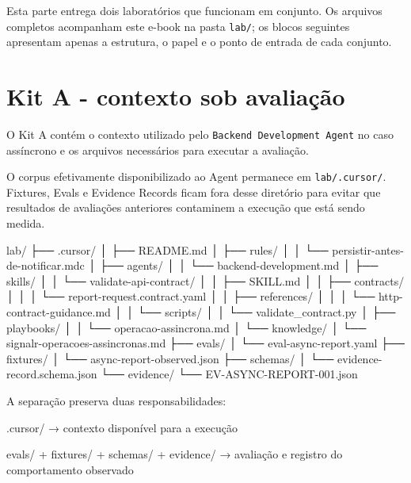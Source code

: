 \documentclass[
  10pt,
  a4paper,
  oneside]{book}
\newenvironment{Shaded}{}{}
\newcommand{\NormalTok}[1]{#1}
\renewenvironment{Shaded}{\begin{snugshade}}{\end{snugshade}}%
\begin{document}
Esta parte entrega dois laboratórios que funcionam em conjunto. Os
arquivos completos acompanham este e-book na pasta \texttt{lab/}; os
blocos seguintes apresentam apenas a estrutura, o papel e o ponto de
entrada de cada conjunto.

\hypertarget{kit-a---contexto-sob-avaliauxe7uxe3o}{%
\section{Kit A - contexto sob
avaliação}\label{kit-a---contexto-sob-avaliauxe7uxe3o}}

O Kit A contém o contexto utilizado pelo
\texttt{Backend\ Development\ Agent} no caso assíncrono e os arquivos
necessários para executar a avaliação.

O corpus efetivamente disponibilizado ao Agent permanece em
\texttt{lab/.cursor/}. Fixtures, Evals e Evidence Records ficam fora
desse diretório para evitar que resultados de avaliações anteriores
contaminem a execução que está sendo medida.

\begin{Shaded}
\begin{Highlighting}[]
\NormalTok{lab/}
\NormalTok{├── .cursor/}
\NormalTok{│   ├── README.md}
\NormalTok{│   ├── rules/}
\NormalTok{│   │   └── persistir{-}antes{-}de{-}notificar.mdc}
\NormalTok{│   ├── agents/}
\NormalTok{│   │   └── backend{-}development.md}
\NormalTok{│   ├── skills/}
\NormalTok{│   │   └── validate{-}api{-}contract/}
\NormalTok{│   │       ├── SKILL.md}
\NormalTok{│   │       ├── contracts/}
\NormalTok{│   │       │   └── report{-}request.contract.yaml}
\NormalTok{│   │       ├── references/}
\NormalTok{│   │       │   └── http{-}contract{-}guidance.md}
\NormalTok{│   │       └── scripts/}
\NormalTok{│   │           └── validate\_contract.py}
\NormalTok{│   ├── playbooks/}
\NormalTok{│   │   └── operacao{-}assincrona.md}
\NormalTok{│   └── knowledge/}
\NormalTok{│       └── signalr{-}operacoes{-}assincronas.md}
\NormalTok{├── evals/}
\NormalTok{│   └── eval{-}async{-}report.yaml}
\NormalTok{├── fixtures/}
\NormalTok{│   └── async{-}report{-}observed.json}
\NormalTok{├── schemas/}
\NormalTok{│   └── evidence{-}record.schema.json}
\NormalTok{└── evidence/}
\NormalTok{    └── EV{-}ASYNC{-}REPORT{-}001.json}
\end{Highlighting}
\end{Shaded}

A separação preserva duas responsabilidades:

\begin{Shaded}
\begin{Highlighting}[]
\NormalTok{.cursor/}
\NormalTok{→ contexto disponível para a execução}

\NormalTok{evals/ + fixtures/ + schemas/ + evidence/}
\NormalTok{→ avaliação e registro do comportamento observado}
\end{Highlighting}
\end{Shaded}
\end{document}
